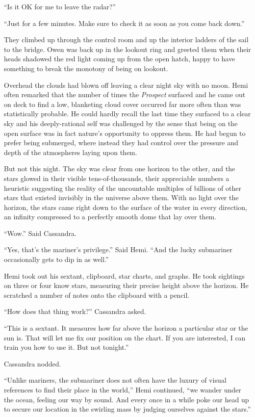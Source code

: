 \documentclass[
]{scrbook}
\begin{document}
``Is it OK for me to leave the radar?''

``Just for a few minutes. Make sure to check it as soon as you come back
down.''

They climbed up through the control room and up the interior ladders of
the sail to the bridge. Owen was back up in the lookout ring and greeted
them when their heads shadowed the red light coming up from the open
hatch, happy to have something to break the monotony of being on
lookout.

Overhead the clouds had blown off leaving a clear night sky with no
moon. Hemi often remarked that the number of times the \emph{Prospect}
surfaced and he came out on deck to find a low, blanketing cloud cover
occurred far more often than was statistically probable. He could hardly
recall the last time they surfaced to a clear sky and his
deeply-rational self was challenged by the sense that being on the open
surface was in fact nature's opportunity to oppress them. He had begun
to prefer being submerged, where instead they had control over the
pressure and depth of the atmospheres laying upon them.

But not this night. The sky was clear from one horizon to the other, and
the stars glowed in their visible tens-of-thousands, their appreciable
numbers a heuristic suggesting the reality of the uncountable multiples
of billions of other stars that existed invisibly in the universe above
them. With no light over the horizon, the stars came right down to the
surface of the water in every direction, an infinity compressed to a
perfectly smooth dome that lay over them.

``Wow.'' Said Cassandra.

``Yes, that's the mariner's privilege.'' Said Hemi. ``And the lucky
submariner occasionally gets to dip in as well.''

Hemi took out his sextant, clipboard, star charts, and graphs. He took
sightings on three or four know stars, measuring their precise height
above the horizon. He scratched a number of notes onto the clipboard
with a pencil.

``How does that thing work?'' Cassandra asked.

``This is a sextant. It measures how far above the horizon a particular
star or the sun is. That will let me fix our position on the chart. If
you are interested, I can train you how to use it. But not tonight.''

Cassandra nodded.

``Unlike mariners, the submariner does not often have the luxury of
visual references to find their place in the world,'' Hemi continued,
``we wander under the ocean, feeling our way by sound. And every once in
a while poke our head up to secure our location in the swirling mass by
judging ourselves against the stars.''
\end{document}
